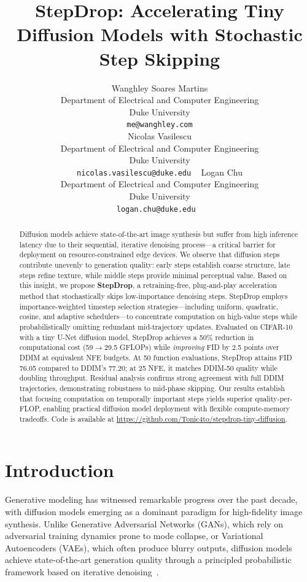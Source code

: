 \documentclass{article}
\title{StepDrop: Accelerating Tiny Diffusion Models with Stochastic Step Skipping}
\author{%
  Wanghley Soares Martins \\
  Department of Electrical and Computer Engineering\\
  Duke University\\
  \texttt{me@wanghley.com} \\
  \And
  Nicolas Vasilescu \\
  Department of Electrical and Computer Engineering\\
  Duke University\\
  \texttt{nicolas.vasilescu@duke.edu} \
  \And
  Logan Chu \\
  Department of Electrical and Computer Engineering\\
  Duke University\\
  \texttt{logan.chu@duke.edu} \
}
\begin{document}
\maketitle

\begin{abstract}
Diffusion models achieve state-of-the-art image synthesis but suffer from high inference latency due to their sequential, iterative denoising process—a critical barrier for deployment on resource-constrained edge devices. We observe that diffusion steps contribute unevenly to generation quality: early steps establish coarse structure, late steps refine texture, while middle steps provide minimal perceptual value. Based on this insight, we propose \textbf{StepDrop}, a retraining-free, plug-and-play acceleration method that stochastically skips low-importance denoising steps. StepDrop employs importance-weighted timestep selection strategies—including uniform, quadratic, cosine, and adaptive schedulers—to concentrate computation on high-value steps while probabilistically omitting redundant mid-trajectory updates. Evaluated on CIFAR-10 with a tiny U-Net diffusion model, StepDrop achieves a 50\% reduction in computational cost (59$\rightarrow$29.5 GFLOPs) while \emph{improving} FID by 2.5 points over DDIM at equivalent NFE budgets. At 50 function evaluations, StepDrop attains FID 76.05 compared to DDIM's 77.20; at 25 NFE, it matches DDIM-50 quality while doubling throughput. Residual analysis confirms strong agreement with full DDIM trajectories, demonstrating robustness to mid-phase skipping. Our results establish that focusing computation on temporally important steps yields superior quality-per-FLOP, enabling practical diffusion model deployment with flexible compute-memory tradeoffs. Code is available at \url{https://github.com/Tonic4to/stepdrop-tiny-diffusion}.
\end{abstract}

\section{Introduction}
\label{sec:intro}

Generative modeling has witnessed remarkable progress over the past decade, with diffusion models emerging as a dominant paradigm for high-fidelity image synthesis. Unlike Generative Adversarial Networks (GANs), which rely on adversarial training dynamics prone to mode collapse, or Variational Autoencoders (VAEs), which often produce blurry outputs, diffusion models achieve state-of-the-art generation quality through a principled probabilistic framework based on iterative denoising~\citep{ho2020denoising, song2020denoising}.
\end{document}
